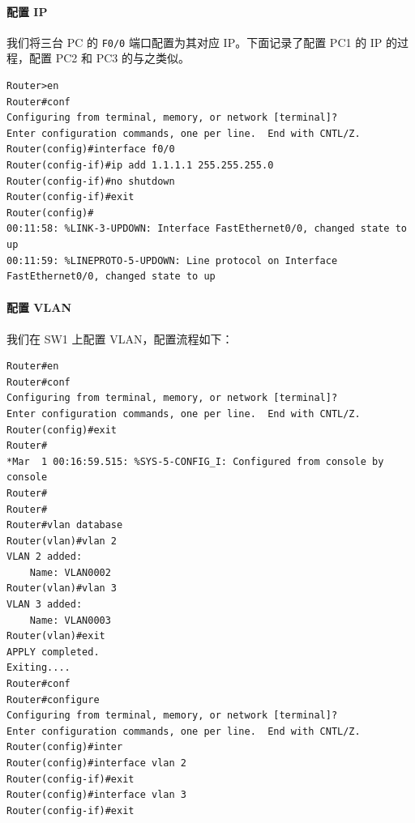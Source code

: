 \documentclass[black,normal,cn]{elegantnote}
\begin{document}
\paragraph{配置 IP}
我们将三台 PC 的 \texttt{F0/0} 端口配置为其对应 IP。下面记录了配置 PC1 的 IP 的过程，配置 PC2 和 PC3 的与之类似。
\begin{lstlisting}
Router>en
Router#conf
Configuring from terminal, memory, or network [terminal]?
Enter configuration commands, one per line.  End with CNTL/Z.
Router(config)#interface f0/0
Router(config-if)#ip add 1.1.1.1 255.255.255.0
Router(config-if)#no shutdown
Router(config-if)#exit
Router(config)#
00:11:58: %LINK-3-UPDOWN: Interface FastEthernet0/0, changed state to up
00:11:59: %LINEPROTO-5-UPDOWN: Line protocol on Interface FastEthernet0/0, changed state to up
\end{lstlisting}

\paragraph{配置 VLAN}
我们在 SW1 上配置 VLAN，配置流程如下：
\begin{lstlisting}
Router#en
Router#conf
Configuring from terminal, memory, or network [terminal]?
Enter configuration commands, one per line.  End with CNTL/Z.
Router(config)#exit
Router#
*Mar  1 00:16:59.515: %SYS-5-CONFIG_I: Configured from console by console
Router#
Router#
Router#vlan database
Router(vlan)#vlan 2
VLAN 2 added:
    Name: VLAN0002
Router(vlan)#vlan 3
VLAN 3 added:
    Name: VLAN0003
Router(vlan)#exit
APPLY completed.
Exiting....
Router#conf
Router#configure
Configuring from terminal, memory, or network [terminal]?
Enter configuration commands, one per line.  End with CNTL/Z.
Router(config)#inter
Router(config)#interface vlan 2
Router(config-if)#exit
Router(config)#interface vlan 3
Router(config-if)#exit
\end{lstlisting}
\end{document}
